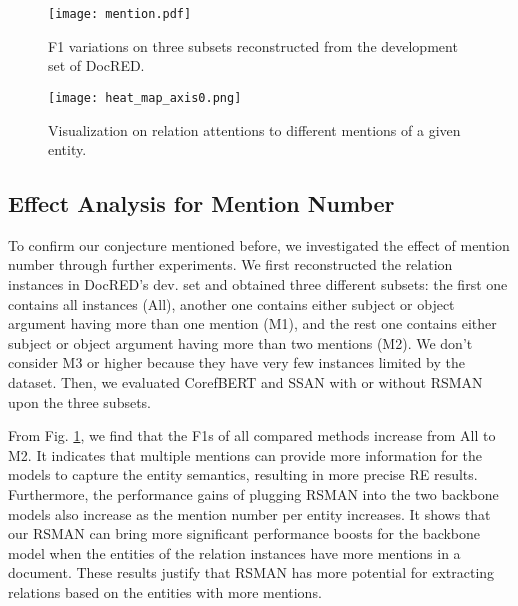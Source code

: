\documentclass[11pt]{article}
\begin{document}
\begin{figure}[t]
\centering
\vspace{-0.1cm}
\texttt{[image: mention.pdf]}
    \vspace{-0.2cm}
    \caption{F1 variations on three subsets reconstructed from the development set of DocRED.} \label{relation instance}
    \vspace{-0.2cm}
\end{figure}

\begin{figure}[t]
\centering
    \texttt{[image: heat\_map\_axis0.png]}
    \vspace{-0.5cm}
    \caption{Visualization on relation attentions to different mentions of a given entity.}
    \label{heatmap}
  \vspace{-0.2cm}
\end{figure}

\subsection{Effect Analysis for Mention Number}
To confirm our conjecture mentioned before, we investigated the effect of mention number through further experiments. We first reconstructed the relation instances in DocRED's dev. set and obtained three different subsets: the first one contains all instances (All), another one contains either subject or object argument having more than one mention (M1), and the rest one contains either subject or object argument having more than two mentions (M2). We don't consider M3 or higher because they have very few instances limited by the dataset. Then, we evaluated CorefBERT and SSAN with or without RSMAN upon the three subsets.

From Fig. \ref{relation instance}, we find that the F1s of all compared methods increase from All to M2. It indicates that multiple mentions can provide more information for the models to capture the entity semantics, resulting in more precise RE results. Furthermore, the performance gains of plugging RSMAN into the two backbone models also increase as the mention number per entity increases. It shows that our RSMAN can bring more significant performance boosts for the backbone model when the entities of the relation instances have more mentions in a document. These results justify that RSMAN has more potential for extracting relations based on the entities with more mentions.
\end{document}
